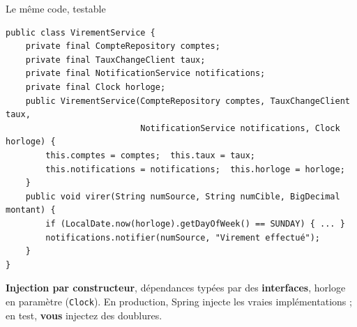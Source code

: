 \documentclass[aspectratio=169,10pt]{beamer}
\begin{document}
\begin{frame}[fragile]{Le même code, testable}
\begin{lstlisting}[basicstyle=\lstcode\scriptsize]
public class VirementService {
    private final CompteRepository comptes;
    private final TauxChangeClient taux;
    private final NotificationService notifications;
    private final Clock horloge;
    public VirementService(CompteRepository comptes, TauxChangeClient taux,
                           NotificationService notifications, Clock horloge) {
        this.comptes = comptes;  this.taux = taux;
        this.notifications = notifications;  this.horloge = horloge;
    }
    public void virer(String numSource, String numCible, BigDecimal montant) {
        if (LocalDate.now(horloge).getDayOfWeek() == SUNDAY) { ... }
        notifications.notifier(numSource, "Virement effectué");
    }
}
\end{lstlisting}
  \small
  \textbf{Injection par constructeur}, dépendances typées par des \textbf{interfaces}, horloge en paramètre (\texttt{Clock}).
  En production, Spring injecte les vraies implémentations ; en test, \textbf{vous} injectez des doublures.
\end{frame}
\end{document}
